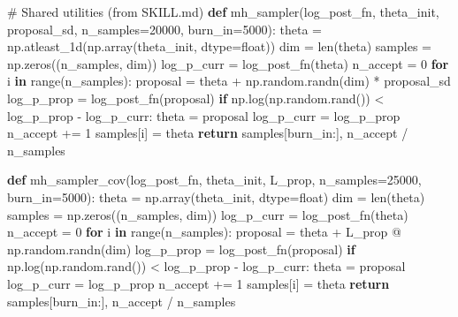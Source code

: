 \documentclass[
  letterpaper,
  DIV=11,
  numbers=noendperiod]{scrartcl}
\newenvironment{Shaded}{\begin{snugshade}}{\end{snugshade}}
\newcommand{\BuiltInTok}[1]{\textcolor[rgb]{0.00,0.23,0.31}{#1}}
\newcommand{\CommentTok}[1]{\textcolor[rgb]{0.37,0.37,0.37}{#1}}
\newcommand{\ControlFlowTok}[1]{\textcolor[rgb]{0.00,0.23,0.31}{\textbf{#1}}}
\newcommand{\DecValTok}[1]{\textcolor[rgb]{0.68,0.00,0.00}{#1}}
\newcommand{\KeywordTok}[1]{\textcolor[rgb]{0.00,0.23,0.31}{\textbf{#1}}}
\newcommand{\NormalTok}[1]{\textcolor[rgb]{0.00,0.23,0.31}{#1}}
\newcommand{\OperatorTok}[1]{\textcolor[rgb]{0.37,0.37,0.37}{#1}}
\begin{document}
\begin{Shaded}
\begin{Highlighting}[]
\CommentTok{\# Shared utilities (from SKILL.md)}
\KeywordTok{def}\NormalTok{ mh\_sampler(log\_post\_fn, theta\_init, proposal\_sd, n\_samples}\OperatorTok{=}\DecValTok{20000}\NormalTok{, burn\_in}\OperatorTok{=}\DecValTok{5000}\NormalTok{):}
\NormalTok{    theta }\OperatorTok{=}\NormalTok{ np.atleast\_1d(np.array(theta\_init, dtype}\OperatorTok{=}\BuiltInTok{float}\NormalTok{))}
\NormalTok{    dim }\OperatorTok{=} \BuiltInTok{len}\NormalTok{(theta)}
\NormalTok{    samples }\OperatorTok{=}\NormalTok{ np.zeros((n\_samples, dim))}
\NormalTok{    log\_p\_curr }\OperatorTok{=}\NormalTok{ log\_post\_fn(theta)}
\NormalTok{    n\_accept }\OperatorTok{=} \DecValTok{0}
    \ControlFlowTok{for}\NormalTok{ i }\KeywordTok{in} \BuiltInTok{range}\NormalTok{(n\_samples):}
\NormalTok{        proposal }\OperatorTok{=}\NormalTok{ theta }\OperatorTok{+}\NormalTok{ np.random.randn(dim) }\OperatorTok{*}\NormalTok{ proposal\_sd}
\NormalTok{        log\_p\_prop }\OperatorTok{=}\NormalTok{ log\_post\_fn(proposal)}
        \ControlFlowTok{if}\NormalTok{ np.log(np.random.rand()) }\OperatorTok{\textless{}}\NormalTok{ log\_p\_prop }\OperatorTok{{-}}\NormalTok{ log\_p\_curr:}
\NormalTok{            theta }\OperatorTok{=}\NormalTok{ proposal}
\NormalTok{            log\_p\_curr }\OperatorTok{=}\NormalTok{ log\_p\_prop}
\NormalTok{            n\_accept }\OperatorTok{+=} \DecValTok{1}
\NormalTok{        samples[i] }\OperatorTok{=}\NormalTok{ theta}
    \ControlFlowTok{return}\NormalTok{ samples[burn\_in:], n\_accept }\OperatorTok{/}\NormalTok{ n\_samples}

\KeywordTok{def}\NormalTok{ mh\_sampler\_cov(log\_post\_fn, theta\_init, L\_prop, n\_samples}\OperatorTok{=}\DecValTok{25000}\NormalTok{, burn\_in}\OperatorTok{=}\DecValTok{5000}\NormalTok{):}
\NormalTok{    theta }\OperatorTok{=}\NormalTok{ np.array(theta\_init, dtype}\OperatorTok{=}\BuiltInTok{float}\NormalTok{)}
\NormalTok{    dim }\OperatorTok{=} \BuiltInTok{len}\NormalTok{(theta)}
\NormalTok{    samples }\OperatorTok{=}\NormalTok{ np.zeros((n\_samples, dim))}
\NormalTok{    log\_p\_curr }\OperatorTok{=}\NormalTok{ log\_post\_fn(theta)}
\NormalTok{    n\_accept }\OperatorTok{=} \DecValTok{0}
    \ControlFlowTok{for}\NormalTok{ i }\KeywordTok{in} \BuiltInTok{range}\NormalTok{(n\_samples):}
\NormalTok{        proposal }\OperatorTok{=}\NormalTok{ theta }\OperatorTok{+}\NormalTok{ L\_prop }\OperatorTok{@}\NormalTok{ np.random.randn(dim)}
\NormalTok{        log\_p\_prop }\OperatorTok{=}\NormalTok{ log\_post\_fn(proposal)}
        \ControlFlowTok{if}\NormalTok{ np.log(np.random.rand()) }\OperatorTok{\textless{}}\NormalTok{ log\_p\_prop }\OperatorTok{{-}}\NormalTok{ log\_p\_curr:}
\NormalTok{            theta }\OperatorTok{=}\NormalTok{ proposal}
\NormalTok{            log\_p\_curr }\OperatorTok{=}\NormalTok{ log\_p\_prop}
\NormalTok{            n\_accept }\OperatorTok{+=} \DecValTok{1}
\NormalTok{        samples[i] }\OperatorTok{=}\NormalTok{ theta}
    \ControlFlowTok{return}\NormalTok{ samples[burn\_in:], n\_accept }\OperatorTok{/}\NormalTok{ n\_samples}


\end{Highlighting}
\end{Shaded}
\end{document}
